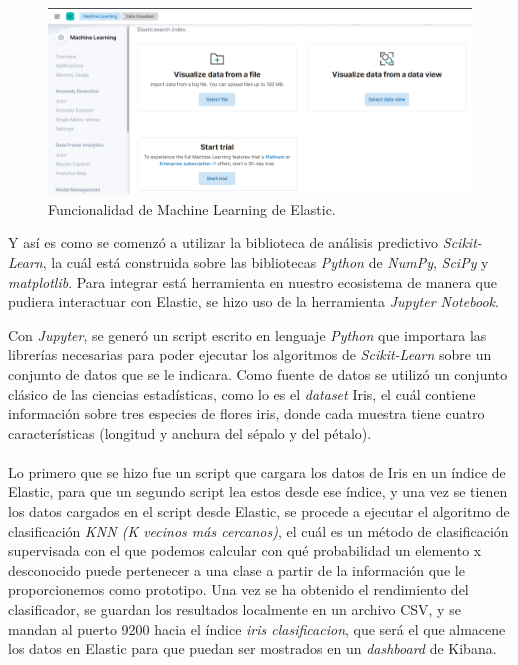 \begin{figure}
    \centering
    \includegraphics[width=1\linewidth]{img/machineLearning.png}
    \caption{Funcionalidad de Machine Learning de Elastic.}
    \label{fig:machine}
\end{figure}

Y así es como se comenzó a utilizar la biblioteca de análisis predictivo \textit{Scikit-Learn}, la cuál está construida sobre las bibliotecas \textit{Python} de \textit{NumPy}, \textit{SciPy} y \textit{matplotlib}. Para integrar está herramienta en nuestro ecosistema de manera que pudiera interactuar con Elastic, se hizo uso de la herramienta  \textit{Jupyter Notebook}. 

Con \textit{Jupyter}, se generó un script escrito en lenguaje \textit{Python} que importara las librerías necesarias para poder ejecutar los algoritmos de \textit{Scikit-Learn} sobre un conjunto de datos que se le indicara. Como fuente de datos se utilizó un conjunto clásico de las ciencias estadísticas, como lo es el \textit{dataset} Iris, el cuál contiene información sobre tres especies de flores iris, donde cada muestra tiene cuatro características (longitud y anchura del sépalo y del pétalo).

\paragraph{}
\paragraph{}

Lo primero que se hizo fue un script que cargara los datos de Iris en un índice de Elastic, para que un segundo script lea estos desde ese índice, y una vez se tienen los datos cargados en el script desde Elastic, se procede a ejecutar el algoritmo de clasificación \textit{KNN (K vecinos más cercanos)}\cite{knn},  el cuál es un método de clasificación supervisada con el que podemos calcular con qué probabilidad un elemento x desconocido puede pertenecer a una clase a partir de la información que le proporcionemos como prototipo. Una vez se ha obtenido el rendimiento del clasificador, se guardan los resultados localmente en un archivo CSV, y se mandan al puerto 9200 hacia el índice \textit{iris clasificacion}, que será el que almacene los datos en Elastic para que puedan ser mostrados en un \textit{dashboard} de Kibana.

